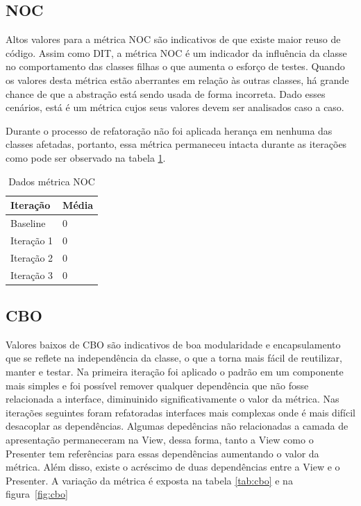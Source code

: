 \subsection{NOC}

Altos valores para a métrica NOC são indicativos de que existe maior reuso de
código. Assim como DIT, a métrica NOC é um indicador da influência da classe
no comportamento das classes filhas o que aumenta o esforço de testes. Quando os
valores desta métrica estão aberrantes em relação às outras classes, há grande
chance de que a abstração está sendo usada de forma incorreta. Dado esses cenários, está é um métrica cujos
seus valores devem ser analisados caso a caso.

Durante o processo de refatoração não foi aplicada herança em nenhuma das
classes afetadas, portanto, essa métrica permaneceu intacta durante as iterações
como pode ser observado na tabela \ref{tab:noc}. %

\begin{table}[!h]
	\centering
	    \caption{Dados métrica NOC}
    \begin{tabular}{ | l | l | }
    \hline
    Iteração & Média 			\\ \hline
    Baseline & 0  	\\ \hline
    Iteração 1 & 0			\\ \hline
	Iteração 2 & 0				\\ \hline
	Iteração 3 & 0	\\ \hline
    \end{tabular}
    \label{tab:noc}
\end{table}


\subsection{CBO}

Valores baixos de CBO são indicativos de boa modularidade e encapsulamento que
se reflete na independência da classe, o que a torna mais fácil de reutilizar,
manter e testar.
Na primeira iteração foi aplicado o padrão em um componente mais simples e foi
possível remover qualquer dependência que não fosse relacionada a interface,
diminuinido significativamente o valor da métrica. Nas iterações seguintes foram
refatoradas interfaces mais complexas onde é mais difícil desacoplar as
dependências. Algumas depedências não relacionadas a camada de apresentação
permaneceram na View, dessa forma, tanto a View como o Presenter tem referências
para essas dependências aumentando o valor da métrica. Além disso, existe o
acréscimo de duas dependências entre a View e o Presenter. A variação da métrica
é exposta na tabela \ref{tab:cbo} e na figura~\ref{fig:cbo}

